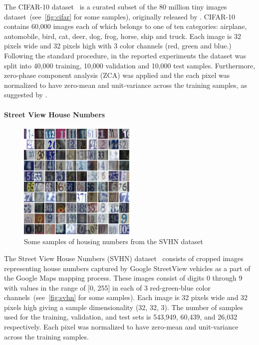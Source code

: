 The CIFAR-10 dataset~\citep{KrizhevskyHinton2009} is a curated subset of the 80
million tiny images dataset~(see~\autoref{fig:cifar} for some samples),
originally released by \citet{Torralba+Fergus+Freeman-2008}. CIFAR-10 contains
60,000 images each of which belongs to one of ten categories: airplane,
automobile, bird, cat, deer, dog, frog, horse, ship and truck. Each image is 32
pixels wide and 32 pixels high with 3 color channels (red, green and blue.)
Following the standard procedure, in the reported experiments the dataset
was split into 40,000 training, 10,000 validation and 10,000 test samples.
Furthermore, zero-phase component analysis (ZCA) was applied and the each pixel
was normalized to have zero-mean and unit-variance across the training samples,
as suggested by \citet{KrizhevskyHinton2009}.

\paragraph{Street View House Numbers}

\begin{figure}[h]
    \centering
    \includegraphics[width=0.5\textwidth]{img/SVHN.png}
    \caption{Some samples of housing numbers from the SVHN dataset}
    \label{fig:svhn}
\end{figure}

The Street View House Numbers (SVHN) dataset~\citep{Netzer-wkshp-2011} consists
of cropped images representing house numbers captured by Google StreetView
vehicles as a part of the Google Maps mapping process. These images consist of
digits 0 through 9 with values in the range of [0, 255] in each of 3
red-green-blue color channels~(see~\autoref{fig:svhn} for some samples). Each
image is 32 pixels wide and 32 pixels high giving a sample dimensionality (32,
32, 3). The number of samples used for the training, validation, and test sets
is 543,949, 60,439, and 26,032 respectively. Each pixel was normalized to have
zero-mean and unit-variance across the training samples.

